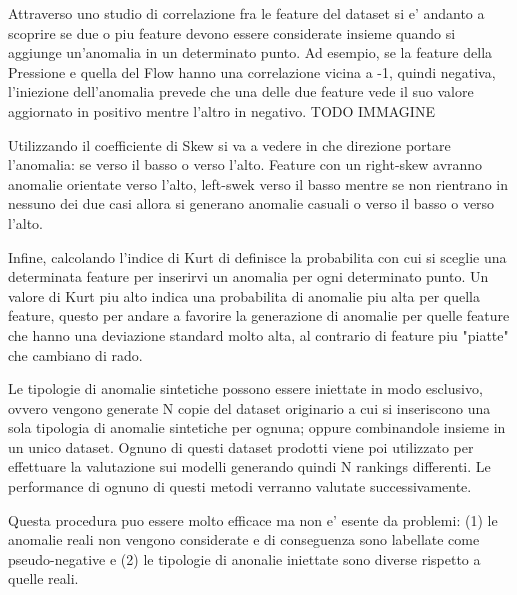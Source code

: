 Attraverso uno studio di correlazione fra le feature del dataset si e' andanto a scoprire se due o piu feature devono essere considerate insieme quando si aggiunge un'anomalia in un determinato punto. Ad esempio, se la feature della Pressione e quella del Flow hanno una correlazione vicina a -1, quindi negativa, l'iniezione dell'anomalia prevede che una delle due feature vede il suo valore aggiornato in positivo mentre l'altro in negativo. TODO IMMAGINE

Utilizzando il coefficiente di Skew si va a vedere in che direzione portare l'anomalia: se verso il basso o verso l'alto. Feature con un right-skew avranno anomalie orientate verso l'alto, left-swek verso il basso mentre se non rientrano in nessuno dei due casi allora si generano anomalie casuali o verso il basso o verso l'alto.

Infine, calcolando l'indice di Kurt di definisce la probabilita con cui si sceglie una determinata feature per inserirvi un anomalia per ogni determinato punto. Un valore di Kurt piu alto indica una probabilita di anomalie piu alta per quella feature, questo per andare a favorire la generazione di anomalie per quelle feature che hanno una deviazione standard molto alta, al contrario di feature piu "piatte" che cambiano di rado.


Le tipologie di anomalie sintetiche possono essere iniettate in modo esclusivo, ovvero vengono generate N copie del dataset originario a cui si inseriscono una sola tipologia di anomalie sintetiche per ognuna; oppure combinandole insieme in un unico dataset. Ognuno di questi dataset prodotti viene poi utilizzato per effettuare la valutazione sui modelli generando quindi N rankings differenti.
Le performance di ognuno di questi metodi verranno valutate successivamente.

Questa procedura puo essere molto efficace ma non e' esente da problemi: (1) le anomalie reali non vengono considerate e di conseguenza sono labellate come pseudo-negative e (2) le tipologie di anonalie iniettate sono diverse rispetto a quelle reali.
